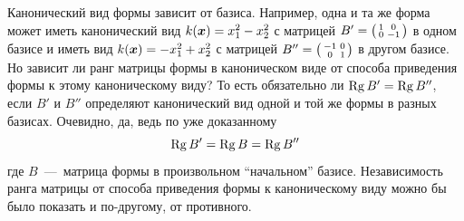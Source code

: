 \documentclass[a4paper,12pt]{article}
\begin{document}
  Канонический вид формы зависит от базиса.
  Например, одна и та же форма может иметь канонический вид $k(\bds x) \hm= x_1^2 - x_2^2$ с матрицей $B' \hm= \left(\begin{smallmatrix} 1 & 0 \\ 0 & -1 \end{smallmatrix}\right)$ в одном базисе и иметь вид $k(\bds x) \hm= -x_1^2 + x_2^2$ с матрицей $B'' \hm= \left(\begin{smallmatrix} -1 & 0 \\ 0 & 1 \end{smallmatrix}\right)$ в другом базисе.
  Но зависит ли ранг матрицы формы в каноническом виде от способа приведения формы к этому каноническому виду?
  То есть обязательно ли $\Rg B' \hm= \Rg B''$, если $B'$ и $B''$ определяют канонический вид одной и той же формы в разных базисах.
  Очевидно, да, ведь по уже доказанному
  \[
    \operatorname{Rg} B' = \operatorname{Rg} B = \operatorname{Rg} B''
  \]
  где $B$~---~матрица формы в произвольном ``начальном'' базисе.
  Независимость ранга матрицы от способа приведения формы к каноническому виду можно бы было показать и по-другому, от противного.
  
\end{document}
